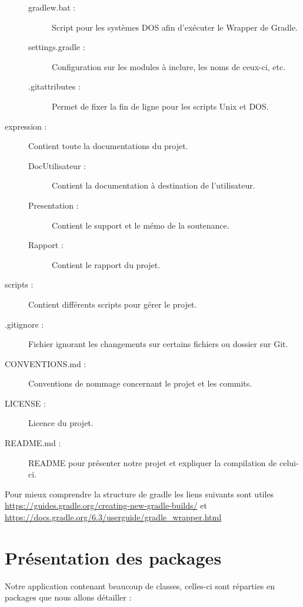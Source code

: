 \begin{description}
\begin{description}
				\item[gradlew.bat :]{Script pour les systèmes DOS afin d'exécuter le Wrapper de Gradle.}
				\item[settings.gradle :]{Configuration sur les modules à inclure, les noms de ceux-ci, etc.}
				\item[.gitattributes :]{Permet de fixer la fin de ligne pour les scripts Unix et DOS.}
			\end{description}
			\item[expression :]{Contient toute la documentations du projet.}
			\begin{description}
				\item[DocUtilisateur :]{Contient la documentation à destination de l'utilisateur.}
				\item[Presentation :]{Contient le support et le mémo de la soutenance.}
				\item[Rapport :]{Contient le rapport du projet.}
			\end{description}
			\item[scripts :]{Contient différents scripts pour gérer le projet.}
			\item[.gitignore :]{Fichier ignorant les changements sur certains fichiers ou dossier sur Git.}
			\item[CONVENTIONS.md :]{Conventions de nommage concernant le projet et les commits.}
			\item[LICENSE :]{Licence du projet.}
			\item[README.md :]{README pour présenter notre projet et expliquer la compilation de celui-ci.}
		\end{description}

		Pour mieux comprendre la structure de gradle les liens suivants sont utiles \url{https://guides.gradle.org/creating-new-gradle-builds/} et \url{https://docs.gradle.org/6.3/userguide/gradle_wrapper.html}

	\section{Présentation des packages}

		Notre application contenant beaucoup de classes, celles-ci sont réparties en packages que nous allons détailler :

